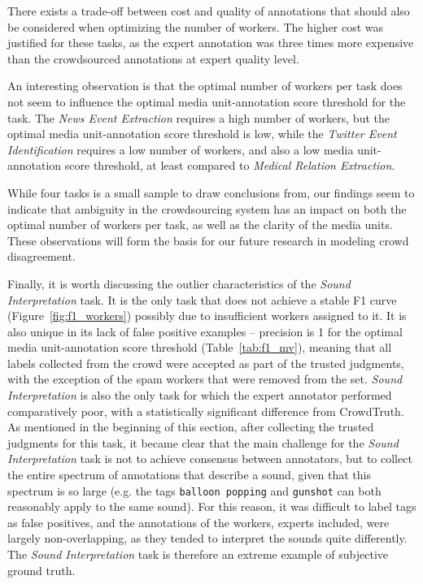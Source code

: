 There exists a trade-off between cost and quality of annotations that should also be considered when optimizing the number of workers.  The higher cost was justified for these tasks, as the expert annotation was three times more expensive than the crowdsourced annotations at expert quality level.

An interesting observation is that the optimal number of workers per task does not seem to influence the optimal media unit-annotation score threshold for the task.  The \textit{News Event Extraction} requires a high number of workers, but the optimal media unit-annotation score threshold is low, while the \textit{Twitter Event Identification} requires a low number of workers, and also a low media unit-annotation score threshold, at least compared to \textit{Medical Relation Extraction}. 

While four tasks is a small sample to draw conclusions from, our findings seem to indicate that ambiguity in the crowdsourcing system has an impact on both the optimal number of workers per task, as well as the clarity of the media units.  These observations will form the basis for our future research in modeling crowd disagreement.

Finally, it is worth discussing the outlier characteristics of the \textit{Sound Interpretation} task. It is the only task that does not achieve a stable F1 curve (Figure~\ref{fig:f1_workers}) possibly due to insufficient workers assigned to it. It is also unique in its lack of false positive examples -- precision is 1 for the optimal media unit-annotation score threshold (Table~\ref{tab:f1_mv}), meaning that all labels collected from the crowd were accepted as part of the trusted judgments, with the exception of the spam workers that were removed from the set.  \textit{Sound Interpretation} is also the only task for which the expert annotator performed comparatively poor, with a statistically significant difference from CrowdTruth. As mentioned in the beginning of this section, after collecting the trusted judgments for this task, it became clear that the main challenge for the \textit{Sound Interpretation} task is not to achieve consensus between annotators, but to collect the entire spectrum of annotations that describe a sound, given that this spectrum is so large (e.g. the tags \texttt{balloon popping} and \texttt{gunshot} can both reasonably apply to the same sound). For this reason, it was difficult to label tags as false positives, and the annotations of the workers, experts included, were largely non-overlapping, as they tended to interpret the sounds quite differently.  The \textit{Sound Interpretation} task is therefore an extreme example of subjective ground truth.


